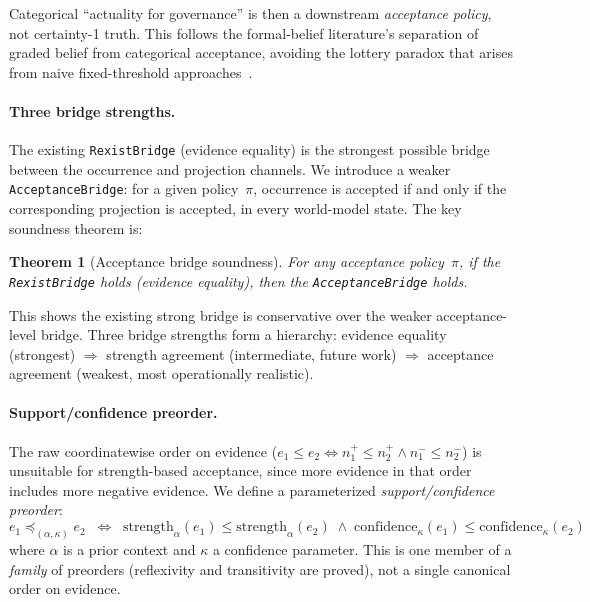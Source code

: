 \documentclass[]{article}
\newtheorem{theorem}{Theorem}
\newcommand{\code}[1]{\texttt{#1}}
\begin{document}
\noindent
Categorical ``actuality for governance'' is then a downstream
\emph{acceptance policy}, not certainty-1 truth.  This follows the
formal-belief literature's separation of graded belief from categorical
acceptance, avoiding the lottery paradox that arises from naive
fixed-threshold approaches~\cite{Foley1993,Hawthorne2009}.

\paragraph{Three bridge strengths.}
The existing \code{RexistBridge} (evidence equality) is the strongest
possible bridge between the occurrence and projection channels.  We
introduce a weaker \code{AcceptanceBridge}: for a given policy~$\pi$,
occurrence is accepted if and only if the corresponding projection is
accepted, in every world-model state.  The key soundness theorem is:

\begin{theorem}[Acceptance bridge soundness]
\label{thm:acceptance-bridge}
For any acceptance policy~$\pi$, if the \code{RexistBridge} holds
(evidence equality), then the \code{AcceptanceBridge} holds.
\end{theorem}

\noindent
This shows the existing strong bridge is conservative over the weaker
acceptance-level bridge.  Three bridge strengths form a hierarchy:
evidence equality (strongest) $\Rightarrow$ strength agreement
(intermediate, future work) $\Rightarrow$ acceptance agreement (weakest,
most operationally realistic).

\paragraph{Support/confidence preorder.}
The raw coordinatewise order on evidence
($e_1 \le e_2 \Leftrightarrow n^+_1 \le n^+_2 \wedge n^-_1 \le n^-_2$)
is unsuitable for strength-based acceptance, since more evidence in that
order includes more negative evidence.  We define a parameterized
\emph{support/confidence preorder}:
\[
  e_1 \preceq_{(\alpha,\kappa)} e_2
  \;\;\Longleftrightarrow\;\;
  \mathrm{strength}_\alpha(e_1) \le \mathrm{strength}_\alpha(e_2)
  \;\wedge\;
  \mathrm{confidence}_\kappa(e_1) \le \mathrm{confidence}_\kappa(e_2)
\]
where $\alpha$ is a prior context and $\kappa$ a confidence parameter.
This is one member of a \emph{family} of preorders (reflexivity and
transitivity are proved), not a single canonical order on evidence.
\end{document}
